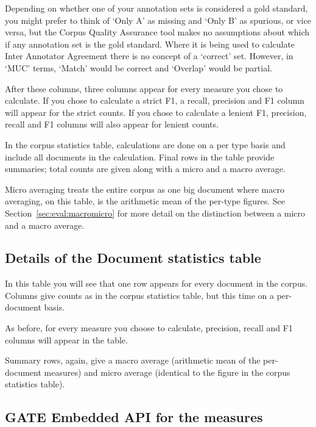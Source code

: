 Depending on whether one of your annotation sets is considered a
gold standard, you might prefer to think of `Only A' as missing and `Only B' as
spurious, or vice versa, but the Corpus Quality Assurance tool makes no
assumptions about which if any annotation set is the gold standard. Where it is
being used to calculate Inter Annotator Agreement there is no concept of a
`correct' set. However, in `MUC' terms, `Match' would be correct and `Overlap'
would be partial.

After these columns, three columns appear for every measure
you chose to calculate. If you chose to calculate a strict F1, a recall,
precision and F1 column will appear for the strict counts. If you chose to
calculate a lenient F1, precision, recall and F1 columns will also appear for
lenient counts.

In the corpus statistics table, calculations are done on a per type
basis and include all documents in the calculation. Final rows in the table
provide summaries; total counts are given along with a micro and a macro average.

Micro averaging treats the entire corpus as one big document where macro
averaging, on this table, is the arithmetic mean of the per-type figures. See
Section~\ref{sec:eval:macromicro} for more detail on the distinction between a
micro and a macro average.

\subsection{Details of the Document statistics table}

In this table you will see that one row appears for
every document in the corpus. Columns give counts as in the corpus statistics
table, but this time on a per-document basis.

As before, for every measure you
choose to calculate, precision, recall and F1 columns will appear in the table.

Summary rows, again, give a macro average (arithmetic mean of the per-document
measures) and micro average (identical to the figure in the corpus
statistics table).

\subsection{GATE Embedded API for the measures}

